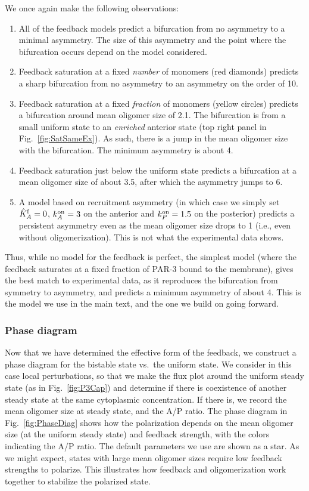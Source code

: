 \documentclass[11pt]{article}
\newcommand{\6}[1]{#1_{\text{6}}}
\newcommand{\3}[1]{#1_{\text{3}}}
\begin{document}
We once again make the following observations:
\begin{enumerate}
\item All of the feedback models predict a bifurcation from no asymmetry to a minimal asymmetry. The size of this asymmetry and the point where the bifurcation occurs depend on the model considered. 
\item Feedback saturation at a fixed \emph{number} of monomers (red diamonds) predicts a sharp bifurcation from no asymmetry to an asymmetry on the order of 10. 
\item Feedback saturation at a fixed \emph{fraction} of monomers (yellow circles) predicts a bifurcation  around mean oligomer size of 2.1. The bifurcation is from a small uniform state to an \emph{enriched} anterior state (top right panel in Fig.\ \ref{fig:SatSameEx}). As such, there is a jump in the mean oligomer size with the bifurcation. The minimum asymmetry is about 4. 
\item Feedback saturation just below the uniform state predicts a bifurcation at a mean oligomer size of about 3.5, after which the asymmetry jumps to 6. 
\item A model based on recruitment asymmetry (in which case we simply set $\hat{K}^\text{f}_A=0$, $k^\text{on}_A=3$ on the anterior and $k^\text{on}_P=1.5$ on the posterior) predicts a persistent asymmetry even as the mean oligomer size drops to 1 (i.e., even without oligomerization). This is not what the experimental data shows.
\end{enumerate}
Thus, while no model for the feedback is perfect, the simplest model (where the feedback saturates at a fixed fraction of PAR-3 bound to the membrane), gives the best match to experimental data, as it reproduces the bifurcation from symmetry to asymmetry, and predicts a minimum asymmetry of about 4. This is the model we use in the main text, and the one we build on going forward.

\subsubsection{Phase diagram}
Now that we have determined the effective form of the feedback, we construct a phase diagram for the bistable state vs.\ the uniform state. We consider in this case local perturbations, so that we make the flux plot around the uniform steady state (as in Fig.\ \ref{fig:P3Cap}) and determine if there is coexistence of another steady state at the same cytoplasmic concentration. If there is, we record the mean oligomer size at steady state, and the A/P ratio. The phase diagram in Fig.\ \ref{fig:PhaseDiag} shows how the polarization depends on the mean oligomer size (at the uniform steady state) and feedback strength, with the colors indicating the A/P ratio. The default parameters we use are shown as a star. As we might expect, states with large mean oligomer sizes require low feedback strengths to polarize. This illustrates how feedback and oligomerization work together to stabilize the polarized state.
\end{document}
